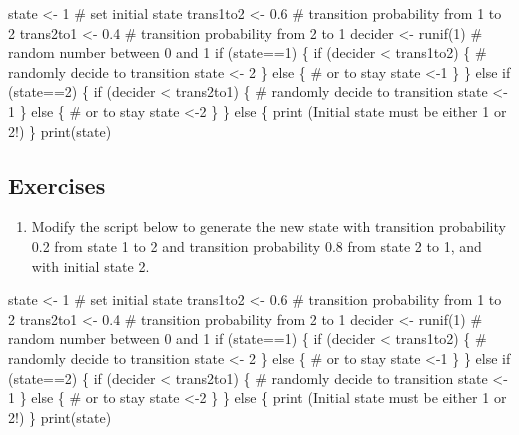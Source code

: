 \documentclass[
  letterpaper,
  DIV=11,
  numbers=noendperiod]{scrreprt}
\newenvironment{Shaded}{\begin{snugshade}}{\end{snugshade}}
\newcommand{\NormalTok}[1]{\textcolor[rgb]{0.00,0.23,0.31}{#1}}
\providecommand{\tightlist}{%
  \setlength{\itemsep}{0pt}\setlength{\parskip}{0pt}}\usepackage{longtable,booktabs,array}
\begin{document}
\begin{Shaded}
\begin{Highlighting}[]
\NormalTok{state \textless{}{-} 1 \# set initial state}
\NormalTok{trans1to2 \textless{}{-} 0.6 \# transition probability from 1 to 2}
\NormalTok{trans2to1 \textless{}{-} 0.4 \# transition probability from 2 to 1}
\NormalTok{decider \textless{}{-} runif(1) \# random number between 0 and 1}
\NormalTok{if (state==1) \{}
\NormalTok{    if (decider \textless{} trans1to2) \{ \# randomly decide to transition}
\NormalTok{        state \textless{}{-} 2}
\NormalTok{    \} else \{ \# or to stay}
\NormalTok{        state \textless{}{-}1}
\NormalTok{    \}}
\NormalTok{\} else if (state==2) \{}
\NormalTok{    if (decider \textless{} trans2to1) \{ \# randomly decide to transition}
\NormalTok{        state \textless{}{-} 1 }
\NormalTok{    \} else \{ \# or to stay}
\NormalTok{        state \textless{}{-}2}
\NormalTok{    \}}
\NormalTok{\} else \{}
\NormalTok{    print (\textquotesingle{}Initial state must be either 1 or 2!\textquotesingle{})}
\NormalTok{\}}
\NormalTok{print(state)    }
\end{Highlighting}
\end{Shaded}

\hypertarget{exercises-35}{%
\subsection*{Exercises}\label{exercises-35}}

\begin{enumerate}
\def\labelenumi{\arabic{enumi}.}
\tightlist
\item
  Modify the script below to generate the new state with transition
  probability 0.2 from state 1 to 2 and transition probability 0.8 from
  state 2 to 1, and with initial state 2.
\end{enumerate}

\begin{Shaded}
\begin{Highlighting}[]
\NormalTok{state \textless{}{-} 1 \# set initial state}
\NormalTok{trans1to2 \textless{}{-} 0.6 \# transition probability from 1 to 2}
\NormalTok{trans2to1 \textless{}{-} 0.4 \# transition probability from 2 to 1}
\NormalTok{decider \textless{}{-} runif(1) \# random number between 0 and 1}
\NormalTok{if (state==1) \{}
\NormalTok{    if (decider \textless{} trans1to2) \{ \# randomly decide to transition}
\NormalTok{        state \textless{}{-} 2}
\NormalTok{    \} else \{ \# or to stay}
\NormalTok{        state \textless{}{-}1}
\NormalTok{    \}}
\NormalTok{\} else if (state==2) \{}
\NormalTok{    if (decider \textless{} trans2to1) \{ \# randomly decide to transition}
\NormalTok{        state \textless{}{-} 1 }
\NormalTok{    \} else \{ \# or to stay}
\NormalTok{        state \textless{}{-}2}
\NormalTok{    \}}
\NormalTok{\} else \{}
\NormalTok{    print (\textquotesingle{}Initial state must be either 1 or 2!\textquotesingle{})}
\NormalTok{\}}
\NormalTok{print(state)}
\end{Highlighting}
\end{Shaded}
\end{document}
